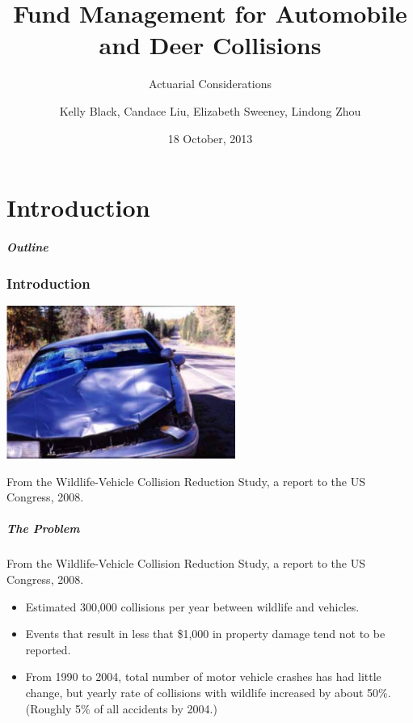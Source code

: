 \documentclass{beamer}   %
\begin{document}
\part{Introduction}


\title{Fund Management for Automobile and Deer Collisions}
\subtitle{Actuarial Considerations}

\author{Kelly Black\footnotemark[1], Candace Liu\footnotemark[1], 
  Elizabeth Sweeney\footnotemark[2], Lindong Zhou\footnotemark[3]}
\date{18 October, 2013}

\begin{frame}[plain]
  \titlepage
\end{frame}

\begin{frame}
  \frametitle{Outline}
  \vspace{-5mm}
  \tableofcontents[]
\end{frame}

\section{Introduction}

\begin{frame}
  \begin{center}
    \includegraphics[height=5cm]{propertyCongressionalStudy}
  \end{center}
  From the Wildlife-Vehicle Collision Reduction Study, a report to the
  US Congress, 2008.
\end{frame}

\begin{frame}
  \frametitle{The Problem}

  From the Wildlife-Vehicle Collision Reduction Study, a report to the
  US Congress, 2008.
  \begin{itemize}
  \item Estimated 300,000 collisions per year between wildlife and
    vehicles.
  \item Events that result in less that \$1,000 in property damage
    tend not to be reported.
  \item From 1990 to 2004, total number of motor vehicle crashes has
    had little change, but yearly rate of collisions with wildlife
    increased by about 50\%. (Roughly 5\% of all accidents by 2004.)
  \end{itemize}
  
\end{frame}
\end{document}
